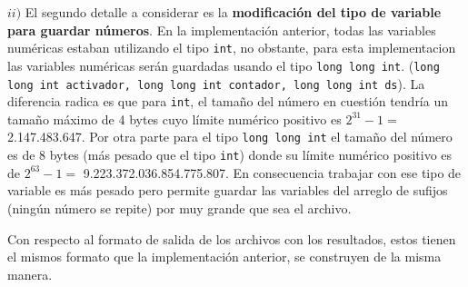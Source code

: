 $ii)$ El segundo detalle a considerar es la \textbf{modificación del tipo de variable para guardar números}. En la implementación anterior, todas las variables numéricas estaban utilizando el tipo \texttt{int}, no obstante, para esta implementacion las variables numéricas serán guardadas usando el tipo \texttt{long long int}. (\texttt{long long int activador, long long int contador, long long int ds}). La diferencia radica es que para \texttt{int}, el tamaño del número en cuestión tendría un tamaño máximo de 4 bytes cuyo límite numérico positivo es $2^{31}-1 =$ 2.147.483.647. Por otra parte para el tipo \texttt{long long int} el tamaño del número es de 8 bytes (más pesado que el tipo \texttt{int}) donde su límite numérico positivo es de $2^{63}-1 =$ 9.223.372.036.854.775.807. En consecuencia trabajar con ese tipo de variable es más pesado pero permite guardar las variables del arreglo de sufijos (ningún número se repite) por muy grande que sea el archivo.

Con respecto al formato de salida de los archivos con los resultados, estos tienen el mismos formato que la implementación anterior, se construyen de la misma manera.

